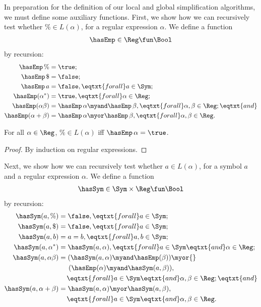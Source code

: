 In preparation for the definition of our local and global simplification
algorithms, we must define some auxiliary functions.
First, we show how we can recursively test whether $\%\in L(\alpha)$, for
a regular expression $\alpha$.  We define a function
%
%
%
\begin{gather*}
\hasEmp\in\Reg\fun\Bool
\end{gather*}
 by recursion:
\begin{align*}
\hasEmp\,\% &= \true ; \\
\hasEmp\,\$ &= \false ; \\
\hasEmp\,a &= \false, \eqtxt{for all}a\in\Sym ; \\
\hasEmp(\alpha^*) &= \true , \eqtxt{for all} \alpha\in\Reg ; \\
\hasEmp(\alpha\beta) &=
\hasEmp\,\alpha\myand\hasEmp\,\beta , \eqtxt{for all} \alpha,\beta\in\Reg ;
  \eqtxt{and} \\
\hasEmp(\alpha+\beta) &=
\hasEmp\,\alpha\myor\hasEmp\,\beta , \eqtxt{for all} \alpha,\beta\in\Reg .
\end{align*}

\begin{proposition}
\label{HasEmpProp}
For all $\alpha\in\Reg$, $\%\in L(\alpha)$ iff $\hasEmp\,\alpha =
\true$.
\end{proposition}

\begin{proof}
By induction on regular expressions.
\end{proof}

Next, we show how we can recursively test whether $a\in L(\alpha)$, for
a symbol $a$ and a regular expression $\alpha$.  We define a function
%
%
%
\begin{gather*}
\hasSym\in\Sym\times\Reg\fun\Bool
\end{gather*}
 by recursion:
\begin{align*}
\hasSym(a, \%) &= \false , \eqtxt{for all} a\in\Sym; \\
\hasSym(a, \$) &= \false , \eqtxt{for all} a\in\Sym; \\
\hasSym(a, b) &= a = b , \eqtxt{for all} a,b\in\Sym; \\
\hasSym(a, \alpha^*) &= \hasSym(a, \alpha) , \eqtxt{for all}
a\in\Sym\eqtxt{and}\alpha\in\Reg ; \\
\hasSym(a, \alpha\beta) &=
(\hasSym(a, \alpha)\myand \hasEmp(\beta)) \myor {} \\
&\quad\;\, (\hasEmp(\alpha)\myand \hasSym(a, \beta)) , \\
&\quad\, \eqtxt{for all} a\in\Sym\eqtxt{and}\alpha,\beta\in\Reg ; \eqtxt{and} \\
\hasSym(a, \alpha+\beta) &=
\hasSym(a, \alpha)\myor\hasSym(a, \beta), \\
&\quad\, \eqtxt{for all} a\in\Sym\eqtxt{and}\alpha,\beta\in\Reg .
\end{align*}

